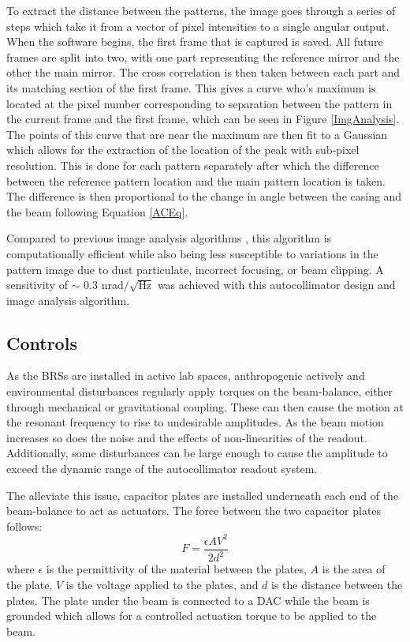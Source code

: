\documentclass [12pt, proquest]{uwthesis}[2019]
\begin{document}
To extract the distance between the patterns, the image goes through a series of steps which take it from a vector of pixel intensities to a single angular output. When the software begins, the first frame that is captured is saved. All future frames are split into two, with one part representing the reference mirror and the other the main mirror. The cross correlation is then taken between each part and its matching section of the first frame. This gives a curve who's maximum is located at the pixel number corresponding to separation between the pattern in the current frame and the first frame, which can be seen in Figure \ref{ImgAnalysis}. The points of this curve that are near the maximum are then fit to a Gaussian which allows for the extraction of the location of the peak with sub-pixel resolution. This is done for each pattern separately after which the difference between the reference pattern location and the main pattern location is taken. The difference is then proportional to the change in angle between the casing and the beam following Equation \ref{ACEq}.

Compared to previous image analysis algorithms \cite{MSA}, this algorithm is computationally efficient while also being less susceptible to variations in the pattern image due to dust particulate, incorrect focusing, or beam clipping. A sensitivity of $\sim$ 0.3 nrad$/\sqrt{\text{Hz}}$ was achieved with this autocollimator design and image analysis algorithm.

\subsection{Controls}

\quad As the BRSs are installed in active lab spaces, anthropogenic actively and environmental disturbances regularly apply torques on the beam-balance, either through mechanical or gravitational coupling. These can then cause the motion at the resonant frequency to rise to undesirable amplitudes. As the beam motion increases so does the noise and the effects of non-linearities of the readout. Additionally, some disturbances can be large enough to cause the amplitude to exceed the dynamic range of the autocollimator readout system.

The alleviate this issue, capacitor plates are installed underneath each end of the beam-balance to act as actuators. The force between the two capacitor plates follows: 
\begin{equation}
F=\frac{\epsilon A V^2}{2d^2} \label{cap}
\end{equation}
where $\epsilon$ is the permittivity of the material between the plates, $A$ is the area of the plate, $V$ is the voltage applied to the plates, and $d$ is the distance between the plates. The plate under the beam is connected to a DAC while the beam is grounded which allows for a controlled actuation torque to be applied to the beam. 
\end{document}
